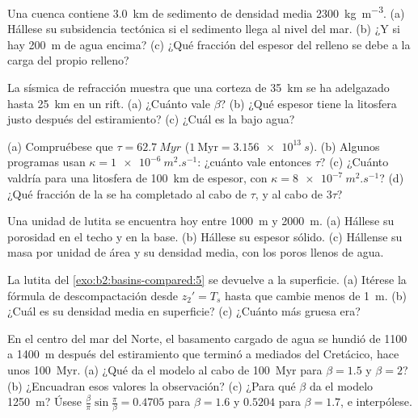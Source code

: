 \begin{exercise}[$\star$]\label{exo:b2:basins-compared:2}
Una cuenca contiene \qty{3.0}{km} de sedimento de densidad media \qty{2300}{kg.m^{-3}}. (a) Hállese su
subsidencia tectónica si el sedimento llega al nivel del mar. (b) ¿Y si hay \qty{200}{m} de agua
encima? (c) ¿Qué fracción del espesor del relleno se debe a la carga del propio relleno?
\end{exercise}

\begin{exercise}[$\star$]\label{exo:b2:basins-compared:3}
La sísmica de refracción muestra que una corteza de \qty{35}{km} se ha adelgazado hasta \qty{25}{km} en un rift.
(a) ¿Cuánto vale $\beta$? (b) ¿Qué espesor tiene la litosfera justo después del estiramiento? (c) ¿Cuál es la
 bajo agua?
\end{exercise}

\begin{exercise}[$\star$]\label{exo:b2:basins-compared:4}
(a) Compruébese que $\tau = \qty{62.7}{Myr}$ ($1~\text{Myr} = \qty{3.156e13}{s}$). (b) Algunos programas
usan $\kappa = \qty{1e-6}{m^2.s^{-1}}$: ¿cuánto vale entonces $\tau$? (c) ¿Cuánto valdría para una
litosfera de \qty{100}{km} de espesor, con $\kappa = \qty{8e-7}{m^2.s^{-1}}$? (d) ¿Qué fracción de
la  se ha completado al cabo de $\tau$, y al cabo de $3\tau$?
\end{exercise}

\begin{exercise}[$\star\star$]\label{exo:b2:basins-compared:5}
Una unidad de lutita se encuentra hoy entre \qty{1000}{m} y \qty{2000}{m}. (a) Hállese su porosidad en el
techo y en la base. (b) Hállese su espesor sólido. (c) Hállense su masa por unidad de área y su densidad
media, con los poros llenos de agua.
\end{exercise}

\begin{exercise}[$\star\star$]\label{exo:b2:basins-compared:6}
La lutita del \cref{exo:b2:basins-compared:5} se devuelve a la superficie. (a) Itérese la
fórmula de descompactación desde $z_2' = T_s$ hasta que cambie menos de \qty{1}{m}. (b) ¿Cuál es
su densidad media en superficie? (c) ¿Cuánto más gruesa era?
\end{exercise}

\begin{exercise}[$\star\star$]\label{exo:b2:basins-compared:7}
En el centro del mar del Norte, el basamento cargado de agua se hundió de 1100 a \qty{1400}{m} después del
estiramiento que terminó a mediados del Cretácico, hace unos \qty{100}{Myr}. (a) ¿Qué 
da el modelo al cabo de \qty{100}{Myr} para $\beta = 1.5$ y $\beta = 2$? (b) ¿Encuadran esos
valores la observación? (c) ¿Para qué $\beta$ da el modelo \qty{1250}{m}?
Úsese $\frac{\beta}{\pi}\sin\frac{\pi}{\beta} = 0.4705$ para $\beta = 1.6$ y $0.5204$ para $\beta
= 1.7$, e interpólese.
\end{exercise}

